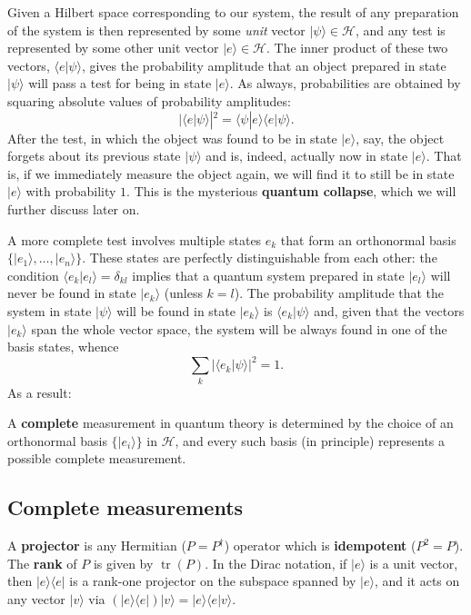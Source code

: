\documentclass[fleqn,a4paper]{article}
\newenvironment{idea}{\everypar{\setlength{\parindent}{1.5em}}}{}
\theoremstyle{definition}
\theoremstyle{definition}
\theoremstyle{definition}
\theoremstyle{definition}
\theoremstyle{remark}
\begin{document}
Given a Hilbert space corresponding to our system, the result of any preparation of the system is then represented by some \emph{unit} vector \(|\psi\rangle\in \mathcal{H}\), and any test is represented by some other unit vector \(|e\rangle\in \mathcal{H}\).
The inner product of these two vectors, \(\langle e|\psi\rangle\), gives the probability amplitude that an object prepared in state \(|\psi\rangle\) will pass a test for being in state \(|e\rangle\).
As always, probabilities are obtained by squaring absolute values of probability amplitudes:
\[
  |\langle e|\psi\rangle|^2
  = \langle\psi|e\rangle\langle e|\psi\rangle.
\]
After the test, in which the object was found to be in state \(|e\rangle\), say, the object forgets about its previous state \(|\psi\rangle\) and is, indeed, actually now in state \(|e\rangle\).
That is, if we immediately measure the object again, we will find it to still be in state \(|e\rangle\) with probability \(1\).
This is the mysterious \textbf{quantum collapse}, which we will further discuss later on.

A more complete test involves multiple states \(e_k\) that form an orthonormal basis \(\{|e_1\rangle,\ldots,|e_n\rangle\}\).
These states are perfectly distinguishable from each other: the condition \(\langle e_k|e_l\rangle = \delta_{kl}\) implies that a quantum system prepared in state \(|e_l\rangle\) will never be found in state \(|e_k\rangle\) (unless \(k=l\)).
The probability amplitude that the system in state \(|\psi\rangle\) will be found in state \(|e_k\rangle\) is \(\langle e_k|\psi\rangle\) and, given that the vectors \(|e_k\rangle\) span the whole vector space, the system will be always found in one of the basis states, whence
\[
  \sum_k |\langle e_k|\psi\rangle|^2 = 1.
\]
As a result:

\begin{idea}
A \textbf{complete} measurement in quantum theory is determined by the choice of an orthonormal basis \(\{|e_i\rangle\}\) in \(\mathcal{H}\), and every such basis (in principle) represents a possible complete measurement.

\end{idea}

\hypertarget{complete-measurements}{%
\subsection{Complete measurements}\label{complete-measurements}}

\begin{idea}
A \textbf{projector} is any Hermitian (\(P=P^\dagger\)) operator which is \textbf{idempotent} (\(P^2=P\)).
The \textbf{rank} of \(P\) is given by \(\operatorname{tr}(P)\).
In the Dirac notation, if \(|e\rangle\) is a unit vector, then \(|e\rangle\langle e|\) is a rank-one projector on the subspace spanned by \(|e\rangle\), and it acts on any vector \(|v\rangle\) via \((|e\rangle\langle e|)|v\rangle = |e\rangle\langle e|v\rangle\).

\end{idea}
\end{document}
